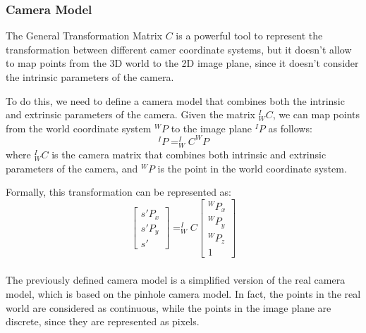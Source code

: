 \subsubsection{Camera Model}
The General Transformation Matrix \( C \) is a powerful tool to represent the transformation between different camer coordinate systems, 
but it doesn't allow to map points from the 3D world to the 2D image plane, since it doesn't consider the intrinsic parameters of the camera.

To do this, we need to define a camera model that combines both the intrinsic and extrinsic parameters of the camera.
Given the matrix $^I_WC$, we can map points from the world coordinate system $^WP$ to the image plane $^IP$ as follows:
\[ ^IP = ^I_WC ^WP \]
where \( ^I_WC \) is the camera matrix that combines both intrinsic and extrinsic parameters of the camera, and \( ^WP \) is the point in the world coordinate system.

Formally, this transformation can be represented as:
\[ \begin{bmatrix}
    s' P_x \\ s' P_y \\ s'
\end{bmatrix} =
^I_WC \begin{bmatrix}
    ^WP_x \\ ^WP_y \\ ^WP_z \\ 1
\end{bmatrix} \]

\subsubsection{}
The previously defined camera model is a simplified version of the real camera model, which is based on the pinhole camera model.
In fact, the points in the real world are considered as continuous, while the points in the image plane are discrete, since they are represented as pixels.

